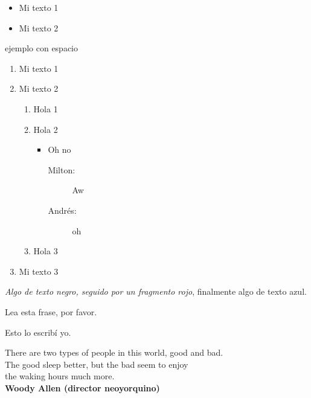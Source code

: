 \documentclass[a5paper, 12pt]{article}
\begin{document}
	\begin{itemize}
		\item Mi texto 1
		\item Mi texto 2
	\end{itemize}        
ejemplo con espacio
	
	\begin{enumerate}
		\item Mi texto 1
		\item Mi texto 2
		
		\begin{enumerate}
			\item Hola 1
			\item Hola 2
			
			\begin{itemize}
				\item Oh no
				
				\begin{description}
					\item[Milton:] Aw
					\item[Andrés:] oh
				\end{description}								
				
			\end{itemize}
			
			\item Hola 3
		\end{enumerate}
		
		\item Mi texto 3
	\end{enumerate}

	
	
	\emph{Algo de texto negro, \color{red} seguido por un fragmento rojo}, {\color {blue} finalmente algo de texto azul.}
%
%
%
	
	\centerline{Lea esta frase, por favor.}


	
	\begin{center}
	
		Esto lo escribí yo.
		
	\end{center}	

\begin{flushright}
   There are two types of people in this world, good and bad. \\
   The good sleep better, but the bad seem to enjoy \\
   the waking hours much more. \\
   \textbf{Woody Allen (director neoyorquino)}
\end{flushright}
\end{document}
